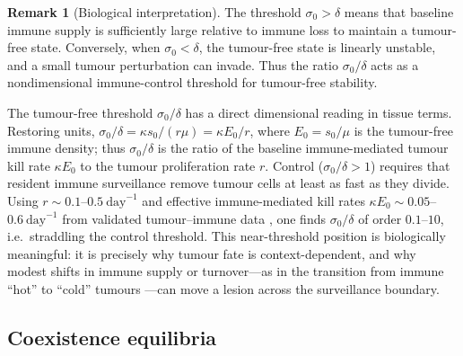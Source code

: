 \documentclass[a4paper,fleqn,longmktitle]{cas-sc}
\theoremstyle{plain}
\theoremstyle{definition}
\newtheorem{remark}[theorem]{Remark}
\numberwithin{equation}{section}
\begin{document}
\begin{remark}[Biological interpretation]
The threshold $\sigma_0>\delta$
means that baseline immune supply is sufficiently large relative to immune loss
to maintain a tumour-free state. Conversely, when $\sigma_0<\delta$,
the tumour-free state is linearly unstable, and a small tumour perturbation can
invade. Thus the ratio $\sigma_0/\delta$ acts as a nondimensional immune-control
threshold for tumour-free stability.

The tumour-free threshold $\sigma_0/\delta$ has a direct dimensional reading in tissue terms.
Restoring units, $\sigma_0/\delta=\kappa s_0/(r\mu)=\kappa E_0/r$, where
$E_0=s_0/\mu$ is the tumour-free immune density; thus $\sigma_0/\delta$ is the
ratio of the baseline immune-mediated tumour kill rate $\kappa E_0$ to the tumour
proliferation rate $r$. Control ($\sigma_0/\delta>1$) requires that resident
immune surveillance remove tumour cells at least as fast as they divide. Using
$r\sim0.1$--$0.5\ \mathrm{day}^{-1}$ and effective immune-mediated kill rates
$\kappa E_0\sim0.05$--$0.6\ \mathrm{day}^{-1}$ from validated tumour--immune
data \cite{de2005validated,yu2026chemotactic,kuznetsov1994nonlinear}, one finds
$\sigma_0/\delta$ of order $0.1$--$10$, i.e.\ straddling the control threshold.
This near-threshold position is biologically meaningful: it is precisely why
tumour fate is context-dependent, and why modest shifts in immune supply or
turnover---as in the transition from immune ``hot'' to ``cold'' tumours
\cite{galon2019approaches}---can move a lesion across the surveillance boundary.
\end{remark}

\subsection{Coexistence equilibria}
\label{subsec:coexistence-equilibria}
\end{document}
